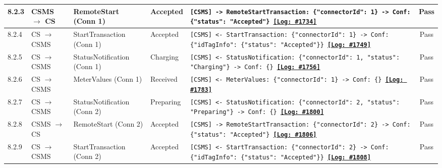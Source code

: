 \documentclass[10pt, a4paper, landscape]{article}
\begin{document}
\begin{longtable}{|p{1.0cm}|p{2.5cm}|p{4.0cm}|p{5.0cm}|p{10.0cm}|c|}
\hline
8.2.3 & CSMS $\to$ CS & RemoteStart (Conn 1) & Accepted & \footnotesize\texttt{[CSMS] -> RemoteStartTransaction: \{"connectorId": 1\} \newline [CS] -> Conf: \{"status": "Accepted"\} \newline \hyperref[log:8.2.3]{\textbf{[Log: \#1734]}}} & Pass \\
\hline
8.2.4 & CS $\to$ CSMS & StartTransaction (Conn 1) & Accepted & \footnotesize\texttt{[CSMS] <- StartTransaction: \{"connectorId": 1\} \newline [CSMS] -> Conf: \{"idTagInfo": \{"status": "Accepted"\}\} \newline \hyperref[log:8.2.4]{\textbf{[Log: \#1749]}}} & Pass \\
\hline
8.2.5 & CS $\to$ CSMS & StatusNotification (Conn 1) & Charging & \footnotesize\texttt{[CSMS] <- StatusNotification: \{"connectorId": 1, "status": "Charging"\} \newline [CSMS] -> Conf: \{\} \newline \hyperref[log:8.2.5]{\textbf{[Log: \#1756]}}} & Pass \\
\hline
8.2.6 & CS $\to$ CSMS & MeterValues (Conn 1) & Received & \footnotesize\texttt{[CSMS] <- MeterValues: \{"connectorId": 1\} \newline [CSMS] -> Conf: \{\} \newline \hyperref[log:8.2.6]{\textbf{[Log: \#1783]}}} & Pass \\
\hline
8.2.7 & CS $\to$ CSMS & StatusNotification (Conn 2) & Preparing & \footnotesize\texttt{[CSMS] <- StatusNotification: \{"connectorId": 2, "status": "Preparing"\} \newline [CSMS] -> Conf: \{\} \newline \hyperref[log:8.2.7]{\textbf{[Log: \#1800]}}} & Pass \\
\hline
8.2.8 & CSMS $\to$ CS & RemoteStart (Conn 2) & Accepted & \footnotesize\texttt{[CSMS] -> RemoteStartTransaction: \{"connectorId": 2\} \newline [CS] -> Conf: \{"status": "Accepted"\} \newline \hyperref[log:8.2.8]{\textbf{[Log: \#1806]}}} & Pass \\
\hline
8.2.9 & CS $\to$ CSMS & StartTransaction (Conn 2) & Accepted & \footnotesize\texttt{[CSMS] <- StartTransaction: \{"connectorId": 2\} \newline [CSMS] -> Conf: \{"idTagInfo": \{"status": "Accepted"\}\} \newline \hyperref[log:8.2.9]{\textbf{[Log: \#1808]}}} & Pass \\

\end{longtable}
\end{document}
